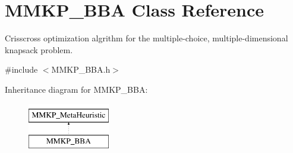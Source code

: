 \hypertarget{class_m_m_k_p___b_b_a}{\section{M\+M\+K\+P\+\_\+\+B\+B\+A Class Reference}
\label{class_m_m_k_p___b_b_a}
}


Crisscross optimization algrithm for the multiple-\/choice, multiple-\/dimensional knapsack problem.  




{\ttfamily \#include $<$M\+M\+K\+P\+\_\+\+B\+B\+A.\+h$>$}

Inheritance diagram for M\+M\+K\+P\+\_\+\+B\+B\+A\+:\begin{figure}[H]
\begin{center}
\leavevmode
\includegraphics[height=2.000000cm]{class_m_m_k_p___b_b_a}
\end{center}
\end{figure}
